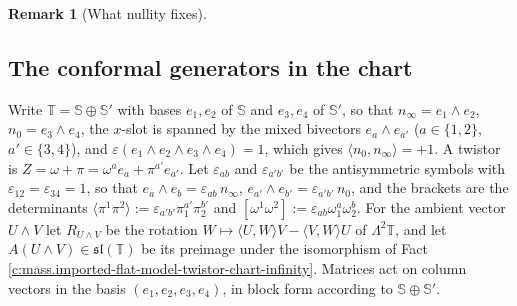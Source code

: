 \documentclass[11pt]{article}
\theoremstyle{definition}
\newtheorem{remark}[theorem]{Remark}
\theoremstyle{plain}
\providecommand{\Sc}{}\renewcommand{\Sc}{\mathbb{S}}
\providecommand{\T}{}\renewcommand{\T}{\mathbb{T}}
\providecommand{\br}{}\renewcommand{\br}[1]{\langle #1\rangle}
\providecommand{\ip}{}\renewcommand{\ip}[2]{\langle #1, #2\rangle}
\begin{document}
\begin{remark}[What nullity fixes]
\end{remark}

\subsection*{The conformal generators in the chart}
\label{c:note.mass.setting-conformal-generators-chart}
Write $\T = \Sc \oplus \Sc'$ with bases $e_{1}, e_{2}$ of $\Sc$ and $e_{3}, e_{4}$ of $\Sc'$, so that $n_{\infty} = e_{1}\wedge e_{2}$, $n_{0} = e_{3}\wedge e_{4}$, the $x$-slot is spanned by the mixed bivectors $e_{a}\wedge e_{a'}$ ($a \in \{1,2\}$, $a' \in \{3,4\}$), and $\varepsilon(e_{1}\wedge e_{2}\wedge e_{3}\wedge e_{4}) = 1$, which gives $\ip{n_{0}}{n_{\infty}} = +1$. A twistor is $Z = \omega + \pi = \omega^{a}e_{a} + \pi^{a'}e_{a'}$. Let $\varepsilon_{ab}$ and $\varepsilon_{a'b'}$ be the antisymmetric symbols with $\varepsilon_{12} = \varepsilon_{34} = 1$, so that $e_{a}\wedge e_{b} = \varepsilon_{ab}\,n_{\infty}$, $e_{a'}\wedge e_{b'} = \varepsilon_{a'b'}\,n_{0}$, and the brackets are the determinants $\br{\pi^{1}\pi^{2}} := \varepsilon_{a'b'}\pi_{1}^{a'}\pi_{2}^{b'}$ and $[\omega^{1}\omega^{2}] := \varepsilon_{ab}\omega_{1}^{a}\omega_{2}^{b}$. For the ambient vector $U \wedge V$ let $R_{U\wedge V}$ be the rotation $W \mapsto \ip{U}{W}V - \ip{V}{W}U$ of $\Lambda^{2}\T$, and let $A(U \wedge V) \in \mathfrak{sl}(\T)$ be its preimage under the isomorphism of Fact \ref{c:mass.imported-flat-model-twistor-chart-infinity}. Matrices act on column vectors in the basis $(e_{1}, e_{2}, e_{3}, e_{4})$, in block form according to $\Sc \oplus \Sc'$.
\end{document}
